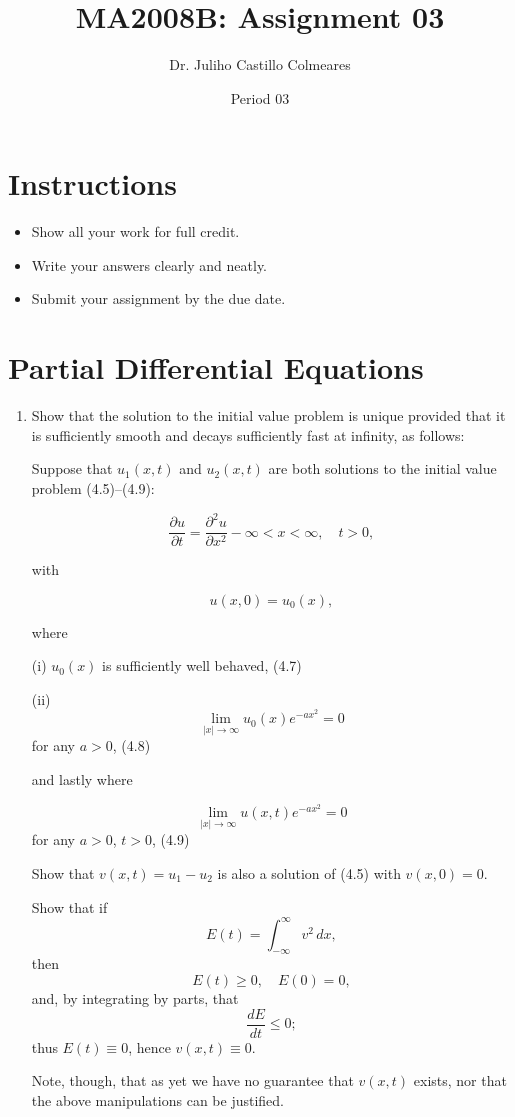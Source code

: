 \documentclass[12pt]{article}
\title{MA2008B: Assignment 03}
\author{Dr. Juliho Castillo Colmeares}
\date{Period 03}
\begin{document}
\maketitle

\section*{Instructions}
\begin{itemize}
    \item Show all your work for full credit.
    \item Write your answers clearly and neatly.
    \item Submit your assignment by the due date.
\end{itemize}

\section{Partial Differential Equations}

\begin{enumerate}
    \item Show that the solution to the initial value problem is unique 
provided that it is sufficiently smooth and decays sufficiently 
fast at infinity, as follows:

Suppose that $u_1(x, t)$ and $u_2(x, t)$ are both solutions to the 
initial value problem (4.5)--(4.9): 

\[\frac{\partial u}{\partial t} = \frac{\partial^2 u}{\partial x^2} - \infty < x < \infty, \quad t > 0, \tag{4.5}\]

with

\[u(x, 0) = u_0(x), \tag{4.6}\]

where

(i) \( u_0(x) \) is sufficiently well behaved, \hspace{20pt} (4.7)

(ii) \[ \lim_{|x|\to\infty} u_0(x)e^{-ax^2} = 0 \] for any \( a > 0 \), \hspace{20pt} (4.8)

and lastly where

\[ \lim_{|x|\to\infty} u(x,t)e^{-ax^2} = 0 \] for any \( a > 0 \), \( t > 0 \), \hspace{20pt} (4.9)

Show that $v(x, t) = u_1 - u_2$ 
is also a solution of (4.5) with $v(x, 0) = 0$. 

Show that if
\[
E(t) = \int_{-\infty}^\infty v^2 \, dx,
\]
then
\[
E(t) \geq 0, \quad E(0) = 0,
\]
and, by integrating by parts, that
\[
\frac{dE}{dt} \leq 0;
\]
thus $E(t) \equiv 0$, hence $v(x, t) \equiv 0$.

Note, though, that as yet we have no guarantee that $v(x, t)$ exists, 
nor that the above manipulations can be justified.
\end{enumerate}
\end{document}
